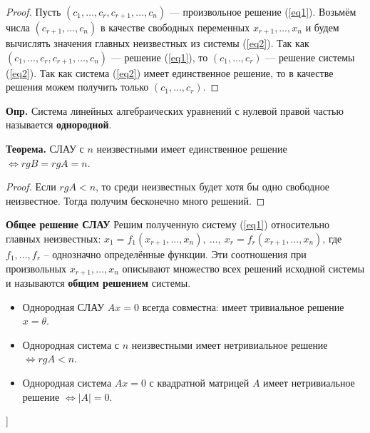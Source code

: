 \begin{proof} Пусть $(c_1, \dots, c_r, c_{r+1}, \dots, c_n)$ --- произвольное решение (\ref{eq1}). Возьмём числа $(c_{r+1}, \dots, c_n)$ в качестве свободных переменных $x_{r+1}, \dots, x_n$ и будем вычислять значения главных неизвестных из системы (\ref{eq2}). Так как $(c_1, \dots, c_r, c_{r+1}, \dots, c_n)$ --- решение (\ref{eq1}), то $(c_1, \dots, c_r)$ --- решение системы (\ref{eq2}). Так как система (\ref{eq2}) имеет единственное решение, то в качестве решения можем получить только $(c_1, \dots, c_r)$. 
\end{proof}

\textbf{Опр.} Система линейных алгебраических уравнений с нулевой правой частью называется \textbf{однородной}.

\textbf{Теорема.} СЛАУ с $n$ неизвестными имеет единственное решение $\iff rgB = rgA = n$.

\begin{proof} Если $rgA < n$, то среди неизвестных будет хотя бы одно свободное неизвестное. Тогда получим бесконечно много решений. 
\end{proof}

\textbf{Общее решение СЛАУ}
Решим полученную систему (\ref{eq1}) относительно главных неизвестных: $x_1 = f_1(x_{r+1}, \dots, x_n), ~ \dots, ~ x_r = f_r(x_{r+1}, \dots, x_n)$, где $f_1, \dots, f_r$ -- однозначно определённые функции. Эти соотношения при произвольных $x_{r+1}, \dots, x_n$ описывают множество всех решений исходной системы и называются \textbf{общим решением} системы.
 
 
\bigbreak
\begin{itemize}
    \item Однородная СЛАУ $Ax = 0$ всегда совместна: имеет тривиальное решение $x = \theta$.
    \item Однородная система с $n$ неизвестными имеет нетривиальное решение $\iff rgA < n$.
    \item Однородная система $Ax = 0$ с квадратной матрицей $A$ имеет нетривиальное решение $\iff |A| = 0$.
\end{itemize}






\bigbreak
[\cite[page 104-109]{kim}]
